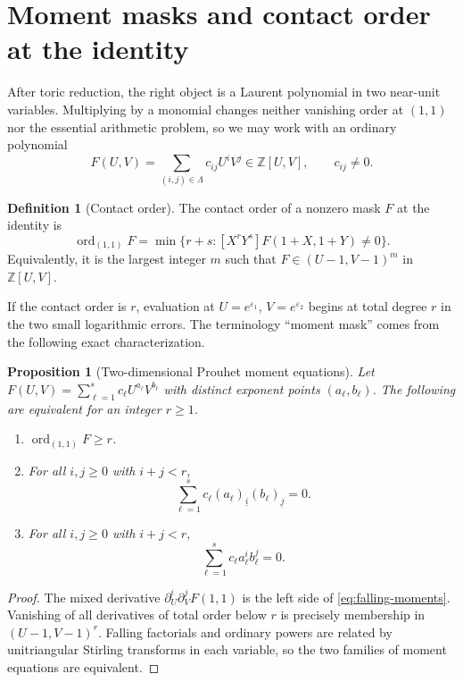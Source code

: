 \documentclass[11pt,oneside]{article}
\newtheorem{proposition}[theorem]{Proposition}
\theoremstyle{definition}
\newtheorem{definition}[theorem]{Definition}
\theoremstyle{remark}
\newcommand{\Z}{\mathbb Z}
\newcommand{\ord}{\operatorname{ord}}
\newcommand{\fall}[2]{\left(#1\right)_{\!\underline{#2}}}
\begin{document}
\section{Moment masks and contact order at the identity}
\label{sec:moment-masks}

After toric reduction, the right object is a Laurent polynomial in two near-unit variables.
Multiplying by a monomial changes neither vanishing order at $(1,1)$ nor the essential
arithmetic problem, so we may work with an ordinary polynomial
\[
 F(U,V)=\sum_{(i,j)\in\Lambda}c_{ij}U^iV^j\in\Z[U,V],
 \qquad c_{ij}\ne0.
\]

\begin{definition}[Contact order]
\label{def:contact-order}
The contact order of a nonzero mask $F$ at the identity is
\begin{equation}
 \ord_{(1,1)}F
 =\min\{r+s:[X^rY^s]F(1+X,1+Y)\ne0\}.
 \label{eq:contact-order}
\end{equation}
Equivalently, it is the largest integer $m$ such that
$F\in(U-1,V-1)^m$ in $\Z[U,V]$.
\end{definition}

If the contact order is $r$, evaluation at $U=e^{\varepsilon_1}$,
$V=e^{\varepsilon_2}$ begins at total degree $r$ in the two small logarithmic errors.  The
terminology ``moment mask'' comes from the following exact characterization.

\begin{proposition}[Two-dimensional Prouhet moment equations]
\label{prop:moment-equations}
Let
$F(U,V)=\sum_{\ell=1}^s c_\ell U^{a_\ell}V^{b_\ell}$ with distinct exponent points
$(a_\ell,b_\ell)$.  The following are equivalent for an integer $r\ge1$.
\begin{enumerate}
\item $\ord_{(1,1)}F\ge r$.
\item For all $i,j\ge0$ with $i+j<r$,
\begin{equation}
  \sum_{\ell=1}^s c_\ell
   \fall{a_\ell}{i}\fall{b_\ell}{j}=0.
  \label{eq:falling-moments}
\end{equation}
\item For all $i,j\ge0$ with $i+j<r$,
\begin{equation}
  \sum_{\ell=1}^s c_\ell a_\ell^i b_\ell^j=0.
  \label{eq:ordinary-moments}
\end{equation}
\end{enumerate}
\end{proposition}

\begin{proof}
The mixed derivative $\partial_U^i\partial_V^jF(1,1)$ is the left side of
\eqref{eq:falling-moments}.  Vanishing of all derivatives of total order below $r$ is
precisely membership in $(U-1,V-1)^r$.  Falling factorials and ordinary powers are related by
unitriangular Stirling transforms in each variable, so the two families of moment equations
are equivalent.
\end{proof}
\end{document}
